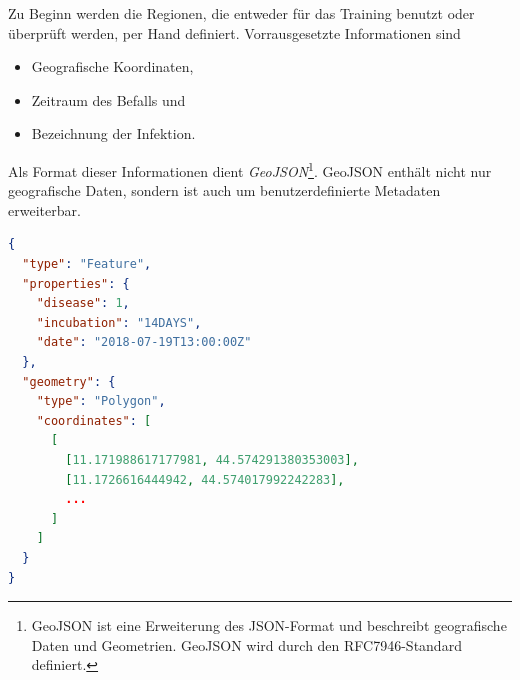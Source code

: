 Zu Beginn werden die Regionen, die entweder für das Training benutzt oder überprüft werden, per Hand definiert. Vorrausgesetzte Informationen sind
\begin{itemize}
	\item Geografische Koordinaten,
	\item Zeitraum des Befalls und
	\item Bezeichnung der Infektion.
\end{itemize}
Als Format dieser Informationen dient \textit{GeoJSON}\footnote{GeoJSON ist eine Erweiterung des JSON-Format und beschreibt geografische Daten und Geometrien. GeoJSON wird durch den RFC7946-Standard definiert.}. GeoJSON enthält nicht nur geografische Daten, sondern ist auch um benutzerdefinierte Metadaten erweiterbar.

\begin{lstlisting}[language=json,caption={Beispiel einer Annotation},captionpos=b]
{
  "type": "Feature",
  "properties": {
    "disease": 1,
    "incubation": "14DAYS",
    "date": "2018-07-19T13:00:00Z"
  },
  "geometry": {
    "type": "Polygon",
    "coordinates": [
      [
        [11.171988617177981, 44.574291380353003],
        [11.1726616444942, 44.574017992242283],
        ...
      ]
    ]
  }
}
\end{lstlisting}
